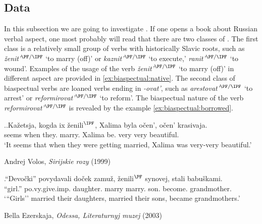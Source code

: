 \subsection{Data}\label{subsection:bi:data}


In this subsection we are going to investigate . If one opens a book about Russian verbal aspect, one most probably will read that there are two classes of . The first class is a relatively small group of verbs with historically Slavic roots, such as \textit{\v{z}enit'}$^{{\PF}/{\IPF}}$ `to marry (off)' or \textit{kaznit'}$^{{\PF}/{\IPF}}$ `to execute,' \textit{ranit'}$^{{\PF}/{\IPF}}$ `to wound'. Examples of the usage of the verb \textit{\v{z}enit'}$^{{\PF}/{\IPF}}$ `to marry (off)' in different aspect are provided in \ref{ex:biaspectual:native}. The second class of biaspectual verbs are loaned verbs ending in \textit{-ovat'}, such as \textit{arestovat'}$^{{\PF}/{\IPF}}$ `to arrest' or \textit{reformirovat'}$^{{\PF}/{\IPF}}$ `to reform'. The biaspectual nature of the verb \textit{reformirovat'}$^{{\PF}/{\IPF}}$ is revealed by the example \ref{ex:biaspectual:borrowed}. 

\ex.\label{ex:biaspectual:native}\ag.Ka\v{z}etsja, kogda ix \v{z}enili$^{\IPF}$, Xalima byla o\v{c}en', o\v{c}en' krasivaja.\\
seems when they. marry. Xalima be. very very beautiful.\\
\vspace{0.5em}
`It seems that when they were getting married, Xalima was very-very beautiful.'
\begin{flushright}
\vspace{-0.5em}
Andrej Volos, \textit{Sirijskie rozy} (1999)
\end{flushright} 
\bg.``Devo\v{c}ki'' povydavali do\v{c}ek zamu\v{z}, \v{z}enili$^{\PF}$ synovej, stali babu\v{s}kami.\\
``girl.'' po.vy.give.imp. daughter. marry marry. son. become. grandmother.\\
\vspace{0.5em}
`{``}Girls'' married their daughters, married their sons, became grandmothers.'
\begin{flushright}
\vspace{-0.5em}
Bella Ezerskaja, \textit{Odessa, Literaturnyj muzej} (2003) 
\end{flushright}

